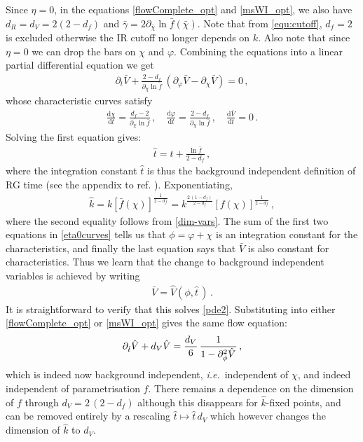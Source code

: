 \documentclass[11pt,draft]{book} %
\newcommand\ie{\textit{i.e.}\ }
\newcommand{\vp}{\varphi}
\newcommand{\bc}{\bar \chi}
\newcommand{\bV}{\bar V}
\newcommand{\hV}{\hat V}
\newcommand{\hk}{\hat k}
\newcommand{\hatt}{\hat t}
\begin{document}
Since $\eta=0$, in the equations \eqref{flowComplete_opt} and \eqref{msWI_opt},
we also have $d_R=d_V=2(2-d_f)$ and $\bar{\gamma}=2\partial_{\bc}\ln\bar{f}(\bc)$.
Note that from \eqref{equ:cutoff}, $d_f=2$ is excluded otherwise the IR cutoff no longer depends on $k$.
Also note that since $\eta=0$ we can drop the bars on $\chi$ and $\vp$.
Combining the equations into a linear partial differential equation we get
\begin{align}
  \label{pde2}
  \partial_t\bV +\frac{2-d_f}{\partial_{\chi}\ln\bar{f}} \,
  \left(\partial_{\vp}\bV-\partial_{\chi}\bV\right) =0\,,
\end{align}
whose characteristic curves satisfy
\begin{align}
  \label{eta0curves}
  \frac{\mathrm d\chi}{\mathrm dt}=\frac{d_f-2}{\partial_{\chi}\ln\bar{f}}\,,
  \quad
  \frac{\mathrm d\vp}{\mathrm dt}=\frac{2-d_f}{\partial_{\chi}\ln\bar{f}}\,,
  \quad
  \frac{\mathrm d\bV}{\mathrm dt}=0\,.
\end{align}
Solving the first equation gives:
\begin{align}
  \label{hatt}
  \hatt = t+\frac{\ln\bar{f}}{2-d_f}\,,
\end{align}
where the integration constant $\hatt$ is thus the background independent definition of RG time
(see the appendix to ref. \cite{Dietz:2015owa}). Exponentiating,
\begin{align}
  \hk = k \left[ \bar{f}(\chi) \right]^{\frac{1}{2-d_f}} = k^{\frac{2\,(1-d_f)}{2-d_f}}
  \left[ f(\chi) \right]^{\frac{1}{2-d_f}}\,,
\end{align}
where the second equality follows from \eqref{dim-vars}.
The sum of the first two equations in \eqref{eta0curves} tells us that $\phi=\vp+\chi$ is an
integration constant for the characteristics,
and finally the last equation says that $\bV$ is also constant for characteristics.
Thus we learn that the change to background independent variables is achieved by writing
\begin{align}
  \label{background-independent}
  \bV = \hV(\phi,\hatt\,)\,.
\end{align}
It is straightforward to verify that this solves \eqref{pde2}.
Substituting into either \eqref{flowComplete_opt} or \eqref{msWI_opt} gives the same flow equation:
\begin{align}
  \label{bi-flow}
  \partial_{\hatt}\hV +d_V\hV = \frac{d_V}{6} \, \frac{1}{1-\partial^2_\phi\hV^{\vphantom{H^H}}}\,,
\end{align}
which is indeed now background independent, \ie independent of $\chi$,
and indeed independent of parametrisation $f$.
There remains a dependence on the dimension of $f$ through $d_V = 2\,(2-d_f)$ although this disappears
for $\hk$-fixed points, and can be removed entirely by a rescaling $\hatt\mapsto \hatt\, d_V$ which however
changes the dimension of $\hat{k}$ to $d_V$.
\end{document}
